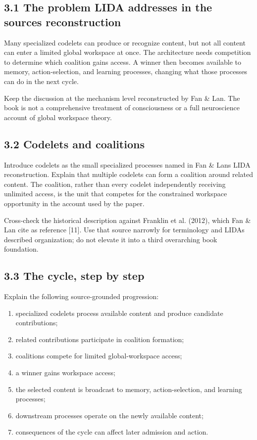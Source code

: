 \subsection{3.1 The problem LIDA addresses in the source\textquotesingle s reconstruction}\label{31-the-problem-lida-addresses-in-the-sources-reconstruction}

Many specialized codelets can produce or recognize content, but not all content can enter a limited global workspace at once. The architecture needs competition to determine which coalition gains access. A winner then becomes available to memory, action-selection, and learning processes, changing what those processes can do in the next cycle.

Keep the discussion at the mechanism level reconstructed by Fan \& Lan. The book is not a comprehensive treatment of consciousness or a full neuroscience account of global workspace theory.

\subsection{3.2 Codelets and coalitions}\label{32-codelets-and-coalitions}

Introduce codelets as the small specialized processes named in Fan \& Lan\textquotesingle s LIDA reconstruction. Explain that multiple codelets can form a coalition around related content. The coalition, rather than every codelet independently receiving unlimited access, is the unit that competes for the constrained workspace opportunity in the account used by the paper.

Cross-check the historical description against Franklin et al. (2012), which Fan \& Lan cite as reference {[}11{]}. Use that source narrowly for terminology and LIDA\textquotesingle s described organization; do not elevate it into a third overarching book foundation.

\subsection{3.3 The cycle, step by step}\label{33-the-cycle-step-by-step}

Explain the following source-grounded progression:

\begin{enumerate}
\def\labelenumi{\arabic{enumi}.}
\tightlist
\item
  specialized codelets process available content and produce candidate contributions;
\item
  related contributions participate in coalition formation;
\item
  coalitions compete for limited global-workspace access;
\item
  a winner gains workspace access;
\item
  the selected content is broadcast to memory, action-selection, and learning processes;
\item
  downstream processes operate on the newly available content;
\item
  consequences of the cycle can affect later admission and action.
\end{enumerate}

